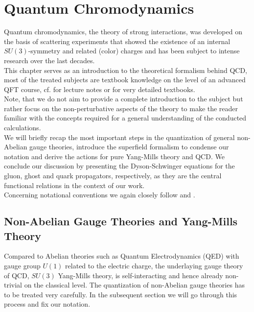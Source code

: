 \chapter{Quantum Chromodynamics}\label{chap:qcd}
Quantum chromodynamics, the theory of strong interactions, was developed on the basis of scattering experiments that showed the existence of an internal $SU(3)$-symmetry and related (color) charges \cite{NPgaugeLecture} and has been subject to intense research over the last decades. \\
This chapter serves as an introduction to the theoretical formalism behind QCD, most of the treated subjects are textbook knowledge on the level of an advanced QFT course, cf. \cite{NPgaugeLecture, QFTNotesFloerchingerWetterich, QFTNotesPawlowskiJaeckel, PawlowskiPlehnQCD} for lecture notes  or \cite{Muta2010, PeskinSchroeder1995, ItzyksonZuber1980, Thomson2013, Georgi1999} for very detailed textbooks.\\
 Note, that we do not aim to provide a complete introduction to the subject but rather focus on the non-perturbative aspects of the theory to make the reader familiar with the concepts required for a general understanding of the conducted calculations.\\
We will briefly recap the most important steps in the quantization of general non-Abelian gauge theories, introduce the superfield formalism to condense our notation and derive the actions for pure Yang-Mills theory and QCD. We conclude our discussion by presenting the Dyson-Schwinger equations for the gluon, ghost and quark propagators, respectively,  as they are the central functional relations in the context of our work.\\
Concerning notational conventions we again closely follow \cite{NPgaugeLecture} and \cite{Cyrol2017}.


\section{Non-Abelian Gauge Theories and Yang-Mills Theory}\label{sec:yang_mills}
Compared to Abelian theories such as Quantum Electrodynamics (QED) with gauge group $U(1)$ related to the electric charge, the underlaying gauge theory of QCD, $SU(3)$ Yang-Mills theory, is self-interacting and hence already non-trivial on the classical level. The quantization of non-Abelian gauge theories has to be treated very carefully. In the subsequent section we will go through this process and fix our notation.                                                                                                                                                                                                                                                                                                                                                                                                                                                                                                            
